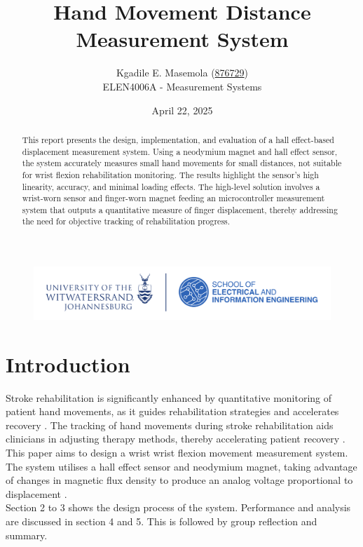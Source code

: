 \documentclass[a4paper,12pt]{article}
\begin{document}
\begin{titlepage}
\begin{figure}
\centering
\includegraphics[scale=0.5]{witseie100logo.png}  
\end{figure}
\title{Hand Movement Distance Measurement System}
\author{Kgadile E. Masemola (\underline{876729})\\ ELEN4006A - Measurement Systems}
\date{April 22, 2025}
\maketitle
%
\begin{abstract}
This report presents the design, implementation, and evaluation of a hall effect-based displacement measurement system. Using a neodymium magnet and hall effect sensor, the system accurately measures small hand movements for small distances, not suitable for wrist flexion rehabilitation monitoring. The results highlight the sensor's high linearity, accuracy, and minimal loading effects. The high-level solution involves a wrist-worn sensor and finger-worn magnet feeding an microcontroller measurement system that outputs a quantitative measure of finger displacement, thereby addressing the need for objective tracking of rehabilitation progress.
\end{abstract}
\end{titlepage}



%
\section{Introduction}
Stroke rehabilitation is significantly enhanced by quantitative monitoring of patient hand movements, as it guides rehabilitation strategies and accelerates recovery \cite{langhorne2011stroke}. The tracking of hand movements during stroke rehabilitation aids clinicians in adjusting therapy methods, thereby accelerating patient recovery \cite{veerbeek2014effects}. This paper aims to design a wrist wrist flexion movement measurement system. The system utilises a hall effect sensor and neodymium magnet, taking advantage of changes in magnetic flux density to produce an analog voltage proportional to displacement \cite{popovic2013hall}.\\
Section 2 to 3 shows the design process of the system. Performance and analysis are discussed in section 4 and 5. This is followed by group reflection and summary.
\end{document}
